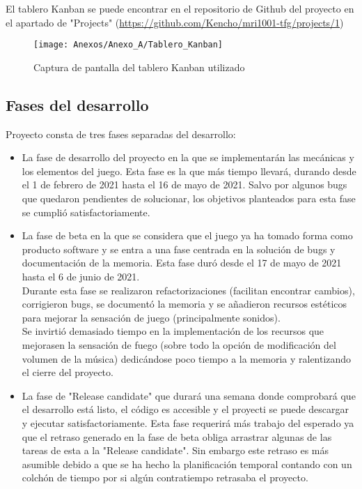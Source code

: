 El tablero Kanban se puede encontrar en el repositorio de Github del proyecto en el apartado de "Projects" (\url{https://github.com/Kencho/mri1001-tfg/projects/1})

\begin{figure}[h]
\centering
\texttt{[image: Anexos/Anexo\_A/Tablero\_Kanban]}
\caption{Captura de pantalla del tablero Kanban utilizado}
\end{figure}
\clearpage

\subsection{Fases del desarrollo}
Proyecto consta de tres fases separadas del desarrollo:
\begin{itemize}
\item
La fase de desarrollo del proyecto en la que se implementarán las mecánicas y los elementos del juego. Esta fase es la que más tiempo llevará, durando desde el 1 de febrero de 2021 hasta el 16 de mayo de 2021. Salvo por algunos bugs que quedaron pendientes de solucionar, los objetivos planteados para esta fase se cumplió satisfactoriamente.
\item
La fase de beta en la que se considera que el juego ya ha tomado forma como producto software y se entra a una fase centrada en la solución de bugs y documentación de la memoria. Esta fase duró desde el 17 de mayo de 2021 hasta el 6 de junio de 2021.\\
Durante esta fase se realizaron refactorizaciones (facilitan encontrar cambios), corrigieron bugs, se documentó la memoria y se añadieron recursos estéticos para mejorar la sensación de juego (principalmente sonidos).\\
Se invirtió demasiado tiempo en la implementación de los recursos que mejorasen la sensación de fuego (sobre todo la opción de modificación del volumen de la música) dedicándose poco tiempo a la memoria y ralentizando el cierre del proyecto.
\item
La fase de "Release candidate" que durará una semana donde comprobará que el desarrollo está listo, el código es accesible y el proyecti se puede descargar y ejecutar satisfactoriamente. Esta fase requerirá más trabajo del esperado ya que el retraso generado en la fase de beta obliga  arrastrar algunas de las tareas de esta a la "Release candidate". Sin embargo este retraso es más asumible debido a que se ha hecho la planificación temporal contando con un colchón de tiempo por si algún contratiempo retrasaba el proyecto.
\end{itemize}

